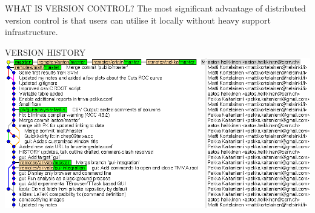 \documentclass[final,hyperref={pdfpagelabels=false},notitlepage=true]{beamer}
\begin{document}
\begin{frame}{}
\begin{columns}[t]
\begin{column}{0.45\linewidth}
\begin{block}{\large WHAT IS VERSION CONTROL?}
\vskip1cm
The most significant advantage of distributed version control is that 
users can utilise it locally without heavy support infrastructure.

    \end{block}

    \vskip2cm
    \begin{block}{\large VERSION HISTORY}
      \vskip1cm
      \includegraphics[width=1.0\linewidth]{images/gitk-history-detail.png}
    \end{block}


\end{column}
\end{columns}
\end{frame}
\end{document}
